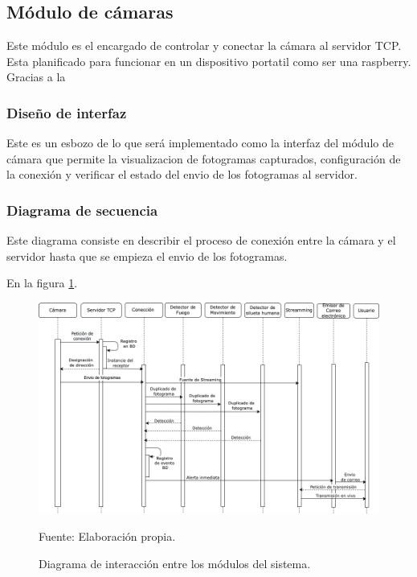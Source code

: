 \subsection{Módulo de cámaras}
Este módulo es el encargado de controlar y conectar la cámara al servidor TCP. Esta planificado para funcionar en un dispositivo portatil como ser una raspberry. Gracias a la
\subsubsection{Diseño de interfaz}
Este es un esbozo de lo que será implementado como la interfaz del módulo de cámara que permite la visualizacion de fotogramas capturados, configuración de la conexión y verificar el estado del envio de los fotogramas al servidor.
\subsubsection{Diagrama de secuencia}
Este diagrama consiste en describir el proceso de conexión entre la cámara y el servidor hasta que se empieza el envio de los fotogramas.

En la figura \ref{fig:diagrama_interaccion_general}.
\begin{figure}[H]
    \begin{center}
        \includegraphics[width=17cm]{img/capitulo_4/interaccion.png}
    \end{center}
    \begin{center}
        \caption{Diagrama de interacción entre los módulos del sistema.}
        Fuente: Elaboración propia.
        \label{fig:diagrama_interaccion_general}
    \end{center}
\end{figure}

